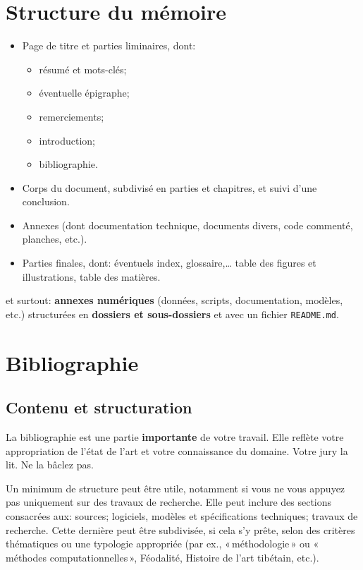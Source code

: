 \documentclass[a4paper,twoside,12pt]{book}
\begin{document}


\section{Structure du mémoire}

\begin{itemize}
	\item Page de titre et parties liminaires, dont: 
	\begin{itemize}
		\item résumé et mots-clés; 
		\item éventuelle épigraphe; 
		\item remerciements; 
		\item introduction; 
		\item bibliographie.
	\end{itemize}
	 \item Corps du document, subdivisé en parties et chapitres, et suivi d'une conclusion.
	 \item Annexes (dont documentation technique, documents divers, code commenté, planches, etc.). \item Parties finales, dont: 
	éventuels index, glossaire,\dots{}  table des figures et illustrations, table des matières.
\end{itemize}

et surtout: \textbf{annexes numériques} (données, scripts, documentation, modèles, etc.) structurées en \textbf{dossiers et sous-dossiers} et avec un fichier \texttt{README.md}.




\section{Bibliographie}


\subsection{Contenu et structuration}

La bibliographie est une partie \textbf{importante} de votre travail. Elle reflète votre appropriation de l'état de l'art et votre connaissance du domaine. Votre jury la lit. Ne la bâclez pas.

Un minimum de structure peut être utile, notamment si vous ne vous appuyez pas uniquement sur des travaux de recherche. Elle peut inclure des sections consacrées aux: sources; logiciels, modèles et spécifications techniques; travaux de recherche. Cette dernière peut être subdivisée, si cela s'y prête, selon des critères thématiques ou une typologie appropriée (par ex., «\,méthodologie\,» ou «\,méthodes computationnelles\,», \og{}Féodalité\fg{}, \og{}Histoire de l'art tibétain\fg{}, etc.).
\end{document}
